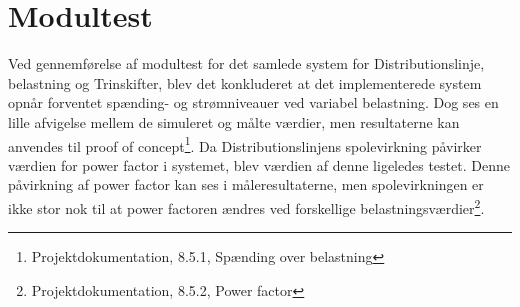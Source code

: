 
\section{Modultest}

Ved gennemførelse af modultest for det samlede system for Distributionslinje, belastning og Trinskifter, blev det konkluderet at det implementerede system opnår forventet spænding- og strømniveauer ved variabel belastning. Dog ses en lille afvigelse mellem de simuleret og målte værdier, men resultaterne kan anvendes til proof of concept\footnote{Projektdokumentation, 8.5.1, Spænding over belastning}. Da Distributionslinjens spolevirkning påvirker værdien for power factor i systemet, blev værdien af denne ligeledes testet. Denne påvirkning af power factor kan ses i måleresultaterne, men spolevirkningen er ikke stor nok til at power factoren ændres ved forskellige belastningsværdier\footnote{Projektdokumentation, 8.5.2, Power factor}. 
